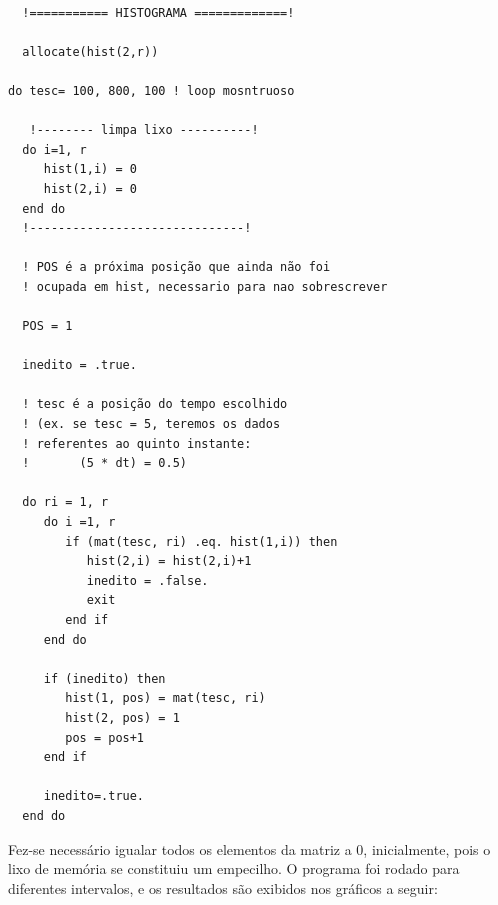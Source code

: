 \documentclass{article}
\begin{document}
\begin{lstlisting}

  !=========== HISTOGRAMA =============!
  
  allocate(hist(2,r))

do tesc= 100, 800, 100 ! loop mosntruoso

   !-------- limpa lixo ----------!
  do i=1, r
     hist(1,i) = 0
     hist(2,i) = 0
  end do
  !------------------------------!
  
  ! POS é a próxima posição que ainda não foi
  ! ocupada em hist, necessario para nao sobrescrever
  
  POS = 1

  inedito = .true.

  ! tesc é a posição do tempo escolhido
  ! (ex. se tesc = 5, teremos os dados
  ! referentes ao quinto instante:
  !       (5 * dt) = 0.5)

  do ri = 1, r
     do i =1, r
        if (mat(tesc, ri) .eq. hist(1,i)) then
           hist(2,i) = hist(2,i)+1
           inedito = .false.
           exit
        end if
     end do

     if (inedito) then
        hist(1, pos) = mat(tesc, ri)
        hist(2, pos) = 1
        pos = pos+1
     end if

     inedito=.true.
  end do
\end{lstlisting}

Fez-se necessário igualar todos os elementos da matriz a 0, inicialmente, pois o lixo de memória se constituiu um empecilho.
O programa foi rodado para diferentes intervalos, e os resultados são exibidos nos gráficos a seguir:
\end{document}
